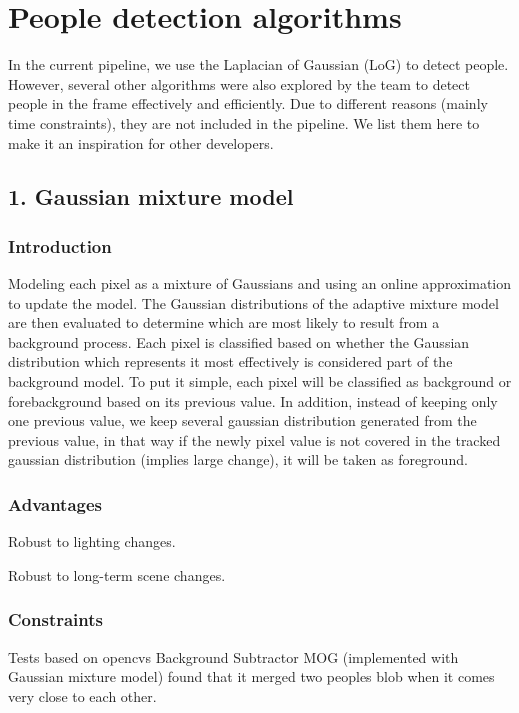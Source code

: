 \section*{People detection algorithms}

In the current pipeline, we use the Laplacian of Gaussian (LoG) to detect people. However, several other algorithms were also explored by the team to detect people in the frame effectively and efficiently. Due to different reasons (mainly time constraints), they are not included in the pipeline. We list them here to make it an inspiration for other developers.

\subsection*{1. Gaussian mixture model}

\subsubsection*{Introduction}

Modeling each pixel as a mixture of Gaussians and using an online approximation to update the model. The Gaussian distributions of the adaptive mixture model are then evaluated to determine which are most likely to result from a background process. Each pixel is classified based on whether the Gaussian distribution which represents it most effectively is considered part of the background model. To put it simple, each pixel will be classified as background or forebackground based on its previous value. In addition, instead of keeping only one previous value, we keep several gaussian distribution generated from the previous value, in that way if the newly pixel value is not covered in the tracked gaussian distribution (implies large change), it will be taken as foreground.

\subsubsection*{Advantages}

Robust to lighting changes.

Robust to long-\/term scene changes.

\subsubsection*{Constraints}

Tests based on opencv\textquotesingle{}s Background Subtractor M\+OG (implemented with Gaussian mixture model) found that it merged two people\textquotesingle{}s blob when it comes very close to each other.


